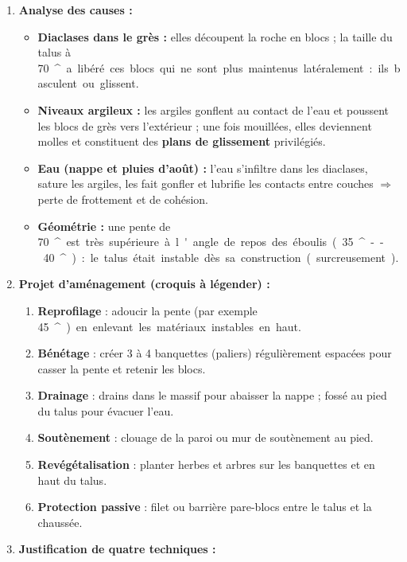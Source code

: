 \documentclass[11pt]{article}
\providecommand{\degree}{^{\circ}}
\begin{document}
\begin{corrige}
\tcblower
\begin{enumerate}
\item \textbf{Analyse des causes :}
      \begin{itemize}
      \item \textbf{Diaclases dans le grès :} elles découpent la roche en blocs ; la taille du talus à \SI{70}{\degree} a libéré ces blocs qui ne sont plus maintenus latéralement : ils basculent ou glissent.
      \item \textbf{Niveaux argileux :} les argiles gonflent au contact de l'eau et poussent les blocs de grès vers l'extérieur ; une fois mouillées, elles deviennent molles et constituent des \textbf{plans de glissement} privilégiés.
      \item \textbf{Eau (nappe et pluies d'août) :} l'eau s'infiltre dans les diaclases, sature les argiles, les fait gonfler et lubrifie les contacts entre couches $\Rightarrow$ perte de frottement et de cohésion.
      \item \textbf{Géométrie :} une pente de \SI{70}{\degree} est très supérieure à l'angle de repos des éboulis (\SI{35}{\degree}--\SI{40}{\degree}) : le talus était instable dès sa construction (surcreusement).
      \end{itemize}
\item \textbf{Projet d'aménagement (croquis à légender) :}
      \begin{enumerate}
      \item \textbf{Reprofilage} : adoucir la pente (par exemple \SI{45}{\degree}) en enlevant les matériaux instables en haut.
      \item \textbf{Bénétage} : créer 3 à 4 banquettes (paliers) régulièrement espacées pour casser la pente et retenir les blocs.
      \item \textbf{Drainage} : drains dans le massif pour abaisser la nappe ; fossé au pied du talus pour évacuer l'eau.
      \item \textbf{Soutènement} : clouage de la paroi ou mur de soutènement au pied.
      \item \textbf{Revégétalisation} : planter herbes et arbres sur les banquettes et en haut du talus.
      \item \textbf{Protection passive} : filet ou barrière pare-blocs entre le talus et la chaussée.
      \end{enumerate}
\item \textbf{Justification de quatre techniques :}

\end{enumerate}
\end{corrige}
\end{document}
